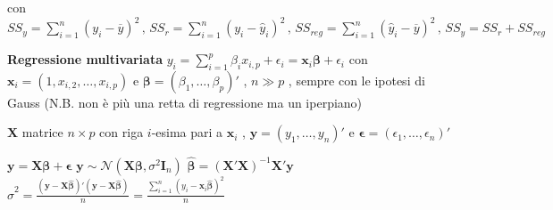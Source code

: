 \documentclass[openany]{book} %
\begin{document}
con $SS_y = \sum_{i=1}^n(y_i-\overline y)^2\,,\,SS_r = \sum_{i=1}^n(y_i-\hat y_i)^2\,,\,SS_{reg} = \sum_{i=1}^n(\hat y_i-\overline y)^2\,,\,SS_y=SS_r+SS_{reg}$

\textbf{Regressione multivariata} $y_i=\sum_{i=1}^p\beta_i x_{i,p}+\epsilon_i = \boldsymbol{x}_i \boldsymbol{\beta}+\epsilon_i$ con $\boldsymbol{x}_i=(1,x_{i,2},\dots,x_{i,p})$ e $\boldsymbol{\beta}=(\beta_1,\dots,\beta_p)'$ , $n\gg p$ , sempre con le ipotesi di Gauss (N.B. non è più una retta di regressione ma un iperpiano)

$\boldsymbol{X}$ matrice $n\times p$ con riga $i$-esima pari a $\boldsymbol{x}_i$ , $\boldsymbol{y}=(y_1,\dots,y_n)'$ e $\boldsymbol{\epsilon}=(\epsilon_1,\dots,\epsilon_n)'$

$\boldsymbol{y}=\boldsymbol{X\beta}+\boldsymbol{\epsilon}$ \quad $\boldsymbol{y}\sim \mathcal{N}(\boldsymbol{X\beta},\sigma^2 \boldsymbol{I}_n)$ \quad $\hat {\boldsymbol{\beta}}=(\boldsymbol{X}'\boldsymbol{X})^{-1}\boldsymbol{X}'\boldsymbol{y}$ \quad $\hat\sigma^2=\frac{(\boldsymbol{y}-\boldsymbol{X}\hat {\boldsymbol{\beta}})'(\boldsymbol{y}-\boldsymbol{X}\hat {\boldsymbol{\beta}})}{n}=\frac{\sum_{i=1}^n(y_i-\boldsymbol{x}_i\hat {\boldsymbol{\beta}})^2}{n}$




\end{document}
